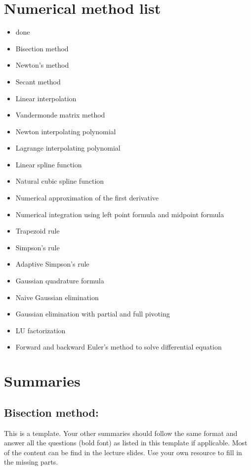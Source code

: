 \documentclass{article}
\begin{document}
	\section{Numerical method list}
	\begin{itemize}
		\item done
		\item Bisection method \checkmark
		\item Newton's method \checkmark
		\item Secant method \checkmark
		\item Linear interpolation \checkmark
		\item Vandermonde matrix method \checkmark
		\item Newton interpolating polynomial \checkmark
		\item Lagrange interpolating polynomial \checkmark
		\item Linear spline function \checkmark
		\item Natural cubic spline function \checkmark
		\item Numerical approximation of the first derivative \checkmark
		\item Numerical integration using left point formula and midpoint formula
		\item Trapezoid rule \checkmark
		\item Simpson's rule \checkmark
		\item Adaptive Simpson's rule \checkmark
		\item Gaussian quadrature formula \checkmark
		\item Naive Gaussian elimination \checkmark
		\item Gaussian elimination with partial and full pivoting \checkmark
		\item LU factorization \checkmark
		\item Forward and backward Euler's method to solve differential equation \checkmark

	\end{itemize}
	\section{Summaries}
	\subsection{Bisection method:}
	This is a template. Your other summaries should follow the same format and answer all the questions (bold font) as listed in this template if applicable. Most of the content can be find in the lecture slides. Use your own resource to fill in the missing parts.\\
	
\end{document}
